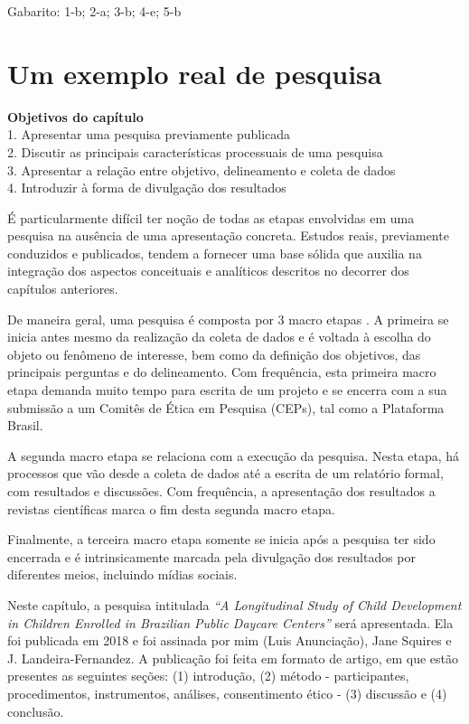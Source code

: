 \documentclass[
]{book}
\newenvironment{objectives}{
  \definecolor{shadecolor}{rgb}{0.764,0.992,0.686}  %
  \color{black}
  \begin{shaded}}
 {\end{shaded}}
\begin{document}
Gabarito: 1-b; 2-a; 3-b; 4-e; 5-b

\hypertarget{um-exemplo-real-de-pesquisa}{%
\chapter{Um exemplo real de pesquisa}\label{um-exemplo-real-de-pesquisa}}

\begin{objectives}
\textbf{Objetivos do capítulo}\\
1. Apresentar uma pesquisa previamente publicada\\
2. Discutir as principais características processuais de uma pesquisa\\
3. Apresentar a relação entre objetivo, delineamento e coleta de dados\\
4. Introduzir à forma de divulgação dos resultados

\end{objectives}

É particularmente difícil ter noção de todas as etapas envolvidas em uma pesquisa na ausência de uma apresentação concreta. Estudos reais, previamente conduzidos e publicados, tendem a fornecer uma base sólida que auxilia na integração dos aspectos conceituais e analíticos descritos no decorrer dos capítulos anteriores.

De maneira geral, uma pesquisa é composta por 3 macro etapas \citep{Mayer2007}. A primeira se inicia antes mesmo da realização da coleta de dados e é voltada à escolha do objeto ou fenômeno de interesse, bem como da definição dos objetivos, das principais perguntas e do delineamento. Com frequência, esta primeira macro etapa demanda muito tempo para escrita de um projeto e se encerra com a sua submissão a um Comitês de Ética em Pesquisa (CEPs), tal como a Plataforma Brasil.

A segunda macro etapa se relaciona com a execução da pesquisa. Nesta etapa, há processos que vão desde a coleta de dados até a escrita de um relatório formal, com resultados e discussões. Com frequência, a apresentação dos resultados a revistas científicas marca o fim desta segunda macro etapa.

Finalmente, a terceira macro etapa somente se inicia após a pesquisa ter sido encerrada e é intrinsicamente marcada pela divulgação dos resultados por diferentes meios, incluindo mídias sociais.

Neste capítulo, a pesquisa intitulada \emph{``A Longitudinal Study of Child Development in Children Enrolled in Brazilian Public Daycare Centers''} será apresentada. Ela foi publicada em 2018 e foi assinada por mim (Luis Anunciação), Jane Squires e J. Landeira-Fernandez. A publicação foi feita em formato de artigo, em que estão presentes as seguintes seções: (1) introdução, (2) método - participantes, procedimentos, instrumentos, análises, consentimento ético - (3) discussão e (4) conclusão.
\end{document}
